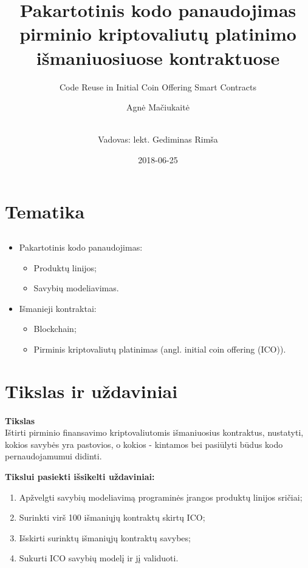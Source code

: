 \documentclass{beamer}
\title{Pakartotinis kodo panaudojimas pirminio kriptovaliutų platinimo išmaniuosiuose kontraktuose}
\subtitle{Code Reuse in Initial Coin Offering Smart Contracts}
\author[shortname]{Agnė Mačiukaitė \and \\ Vadovas: lekt. Gediminas Rimša  }
\date{2018-06-25}
\begin{document}
	
\maketitle


\section{Tematika}

\subsection{}
\begin{frame}{\insertsection}
\framesubtitle{\insertsubsection}
    \vspace{-35.5pt}
\begin{itemize}
	\item Pakartotinis kodo panaudojimas:
    \begin{itemize}
        \item Produktų linijos;
        \item Savybių modeliavimas.
    \end{itemize}

    \item Išmanieji kontraktai:
	\begin{itemize}
        \item Blockchain;
        \item Pirminis kriptovaliutų platinimas (angl. initial coin offering (ICO)).
    \end{itemize}
\end{itemize}
\end{frame}


\section{Tikslas ir uždaviniai}
\begin{frame}{\insertsection}
	\framesubtitle{\insertsubsection}
    \vspace{-35.5pt}
	\setlength\parindent{20pt}\textbf{Tikslas}\\
    
    Ištirti pirminio finansavimo kriptovaliutomis išmaniuosius kontraktus, nustatyti, kokios savybės yra pastovios, o kokios - kintamos bei pasiūlyti būdus kodo pernaudojamumui didinti. 
    
  
    \textbf{Tikslui pasiekti išsikelti uždaviniai:}
    \begin{enumerate}
        \item Apžvelgti savybių modeliavimą programinės įrangos produktų linijos sričiai;
        \item Surinkti virš 100 išmaniųjų kontraktų skirtų ICO;
        \item Išskirti surinktų išmaniųjų kontraktų savybes;
        \item Sukurti ICO savybių modelį ir jį validuoti.
    \end{enumerate}
\end{frame}
\end{document}
